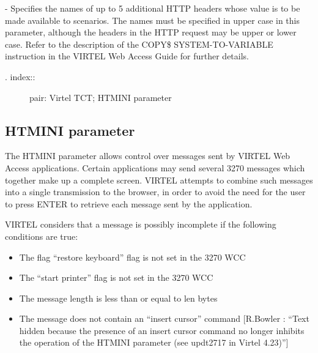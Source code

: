 \documentclass[letterpaper,10pt,english]{sphinxmanual}
\begin{document}
 - Specifies the names of up to 5 additional HTTP headers whose value is to be made available to scenarios. The names must be specified in upper case in this parameter, although the headers in the HTTP request may be upper or lower case. Refer to the description of the COPY\$ SYSTEM-TO-VARIABLE instruction in the VIRTEL Web Access Guide for further details.
\begin{description}
\item[{. index::}] \leavevmode
pair: Virtel TCT; HTMINI parameter

\end{description}


\subsection{HTMINI parameter}
\label{\detokenize{Installation_Guide:htmini-parameter}}
\begin{sphinxVerbatim}[commandchars=\\\{\}]
                  
\end{sphinxVerbatim}

The HTMINI parameter allows control over messages sent by VIRTEL Web Access applications. Certain applications may send several 3270 messages which together make up a complete screen. VIRTEL attempts to combine such messages into a single transmission to the browser, in order to avoid the need for the user to press ENTER to retrieve each message sent by the application.

VIRTEL considers that a message is possibly incomplete if the following conditions are true:
\begin{itemize}
\item {} 
The flag “restore keyboard” flag is not set in the 3270 WCC

\item {} 
The “start printer” flag is not set in the 3270 WCC

\item {} 
The message length is less than or equal to len bytes

\item {} 
The message does not contain an “insert cursor” command {[}R.Bowler : “Text hidden because the presence of an insert cursor command no longer inhibits the operation of the HTMINI parameter (see updt2717 in Virtel 4.23)”{]}

\end{itemize}
\end{document}

